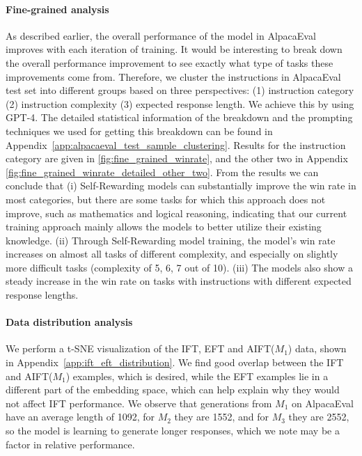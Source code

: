 \documentclass{article}
\begin{document}
\paragraph{Fine-grained analysis}
As described earlier, the overall performance of the model in AlpacaEval improves with each iteration of training. It would be interesting to break down the overall performance improvement to see exactly what type of tasks these improvements come from. Therefore, we cluster the instructions in AlpacaEval test set into different groups based on three perspectives: (1) instruction category (2) instruction complexity (3) expected response length. We achieve this by using GPT-4. The detailed statistical information of the breakdown and the prompting techniques we used for getting this breakdown can be found in Appendix~\ref{app:alpacaeval_test_sample_clustering}. Results for  the instruction category are given in \autoref{fig:fine_grained_winrate}, and the other two in Appendix \autoref{fig:fine_grained_winrate_detailed_other_two}. From the results we can conclude that (i) Self-Rewarding models can substantially improve the win rate in most categories, but there are some tasks for which this approach does not improve, such as mathematics and logical reasoning, indicating that our current training approach mainly allows the models to better utilize their existing knowledge.
(ii) Through Self-Rewarding model training, the model's win rate increases on almost all tasks of different complexity, and especially on slightly more difficult tasks (complexity of 5, 6, 7 out of 10). (iii) The models also show a steady increase in the win rate on tasks with instructions with different expected response lengths.



\paragraph{Data distribution analysis}
We perform a t-SNE \citep{van2008visualizing} visualization of the IFT, EFT and AIFT($M_1$) data, shown in Appendix~\ref{app:ift_eft_distribution}. We find good overlap between the IFT and AIFT($M_1$) examples, which is desired, while the EFT examples lie in a different part of the embedding space, which can help explain why they would not affect IFT performance. 
We observe that generations from $M_1$ on AlpacaEval have an average length of 1092, for $M_2$ they are 
1552, and for $M_3$ they are 2552, so the model is learning to generate longer responses, which we note may be a factor in relative performance.
\end{document}
